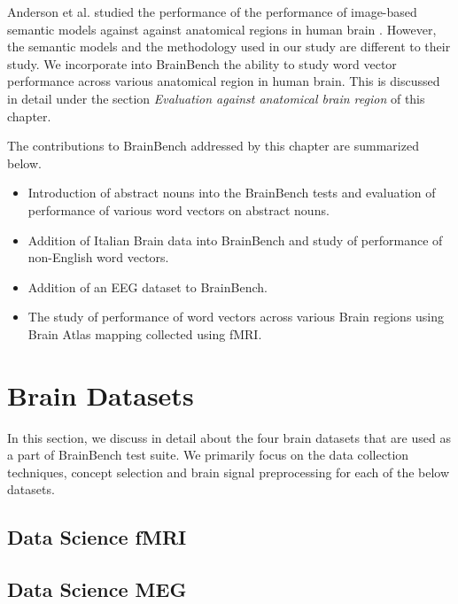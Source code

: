 Anderson et al. studied the performance of  the performance of image-based semantic models against against anatomical regions in human brain \cite{andersonBrainEyes}. However, the semantic models and the methodology used in our study are different to their study. We incorporate into BrainBench the ability to study word vector performance across various anatomical region in human brain. This is discussed in detail under the section \textit{Evaluation against anatomical brain region} of this chapter.

The contributions to BrainBench addressed by this chapter are summarized below.

\begin{itemize}

\item {Introduction of abstract nouns into the BrainBench tests and evaluation of performance of various word vectors on abstract nouns.}
\item{Addition of Italian Brain data into BrainBench and study of performance of non-English word vectors.}
\item {Addition of an EEG dataset to BrainBench.}
\item {The study of performance of word vectors across various Brain regions using Brain Atlas mapping collected using fMRI.}
\end{itemize}

\section{Brain Datasets}
In this section, we discuss in detail about the four brain datasets that are used as a part of BrainBench test suite. We primarily focus on the data collection techniques, concept selection and brain signal preprocessing for each of the below datasets.

\subsection{Data Science fMRI}

\subsection{Data Science MEG}


